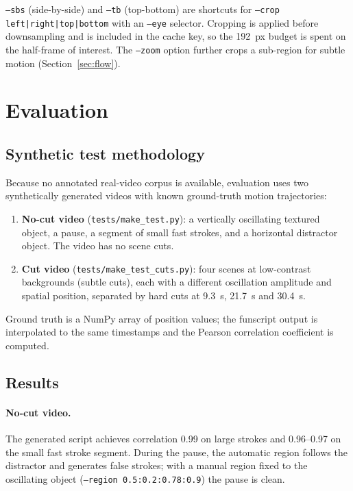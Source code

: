 \documentclass[12pt,a4paper]{article}
\begin{document}
\texttt{--sbs} (side-by-side) and \texttt{--tb} (top-bottom) are shortcuts for
\texttt{--crop left|right|top|bottom} with an \texttt{--eye} selector. Cropping
is applied before downsampling and is included in the cache key, so the 192~px
budget is spent on the half-frame of interest. The \texttt{--zoom} option
further crops a sub-region for subtle motion (Section~\ref{sec:flow}).

\section{Evaluation}
\label{sec:eval}

\subsection{Synthetic test methodology}

Because no annotated real-video corpus is available, evaluation uses two
synthetically generated videos with known ground-truth motion trajectories:

\begin{enumerate}
  \item \textbf{No-cut video} (\texttt{tests/make\_test.py}): a vertically
    oscillating textured object, a pause, a segment of small fast strokes,
    and a horizontal distractor object. The video has no scene cuts.
  \item \textbf{Cut video} (\texttt{tests/make\_test\_cuts.py}): four scenes
    at low-contrast backgrounds (subtle cuts), each with a different oscillation
    amplitude and spatial position, separated by hard cuts at 9.3~s, 21.7~s
    and 30.4~s.
\end{enumerate}

Ground truth is a NumPy array of position values; the funscript output is
interpolated to the same timestamps and the Pearson correlation coefficient is
computed.

\subsection{Results}

\paragraph{No-cut video.} The generated script achieves correlation 0.99 on
large strokes and 0.96--0.97 on the small fast stroke segment. During the
pause, the automatic region follows the distractor and generates false strokes;
with a manual region fixed to the oscillating object (\texttt{--region
0.5:0.2:0.78:0.9}) the pause is clean.
\end{document}
